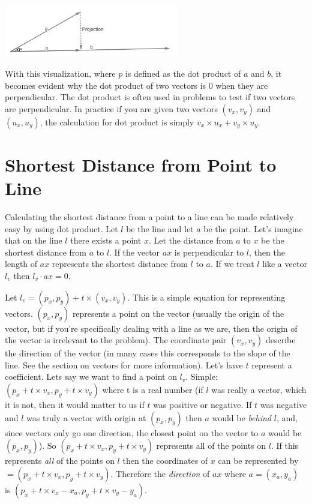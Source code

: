 \documentclass[10pt]{book}
\begin{document}
\begin{center}
\includegraphics[width=3in]{images/dot-product}
\end{center}

With this visualization, where $p$ is defined as the dot product of $a$ and $b$, it becomes evident why the dot product of two vectors is 0 when they are perpendicular. The dot product is often used in problems to test if two vectors are perpendicular. In practice if you are given two vectors $(v_x, v_y)$ and $(u_x, u_y)$, the calculation for dot product is simply $v_x \times u_x + v_y \times u_y$.
 
\section{Shortest Distance from Point to Line}

Calculating the shortest distance from a point to a line can be made relatively easy by using dot product. Let $l$ be the line and let $a$ be the point. Let's imagine that on the line $l$ there exists a point $x$. Let the distance from $a$ to $x$ be the shortest distance from $a$ to $l$. If the vector $ax$ is perpendicular to $l$, then the length of $ax$ represents the shortest distance from $l$ to $a$. If we treat $l$ like a vector $l_v$ then $l_v \cdot ax = 0$.

 
Let $l_v = (p_x, p_y) + t \times (v_x, v_y)$. This is a simple equation for representing vectors. $(p_x, p_y)$ represents a point on the vector (usually the origin of the vector, but if you're specifically dealing with a line as we are, then the origin of the vector is irrelevant to the problem). The coordinate pair $(v_x, v_y)$ describe the direction of the vector (in many cases this corresponds to the slope of the line. See the section on vectors for more information). Let's have $t$ represent a coefficient. Lets say we want to find a point on $l_v$. Simple: $(p_x + t \times v_x, p_y + t \times v_y)$ where t is a real number (if $l$ was really a vector, which it is not, then it would matter to us if $t$ was positive or negative. If $t$ was negative and $l$ was truly a vector with origin at $(p_x, p_y)$ then $a$ would be \emph{behind} $l$, and, since vectors only go one direction, the closest point on the vector to $a$ would be $(p_x, p_y)$). So $(p_x + t \times v_x, p_y + t \times v_y)$ represents all of the points on $l$. If this represents \emph{all} of the points on $l$ then the coordinates of $x$ can be represented by $= (p_x + t \times v_x, p_y + t \times v_y)$. Therefore the \emph{direction} of $ax$ where $a = (x_a, y_a)$ is $(p_x + t \times v_x - x_a, p_y + t \times v_y - y_a)$.
\end{document}
